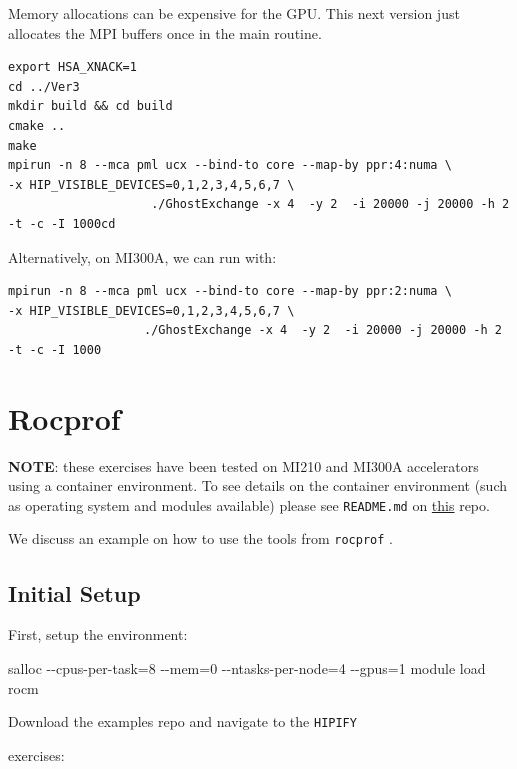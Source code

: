 \documentclass[
]{article}
\let\oldtexttt\texttt
\renewcommand{\texttt}[1]{
  \colorbox{Light}{\oldtexttt{#1}}
}
\newenvironment{Shaded}{}{}
\newcommand{\ExtensionTok}[1]{#1}
\newcommand{\NormalTok}[1]{#1}
\begin{document}
Memory allocations can be expensive for the GPU. This next version just
allocates the MPI buffers once in the main routine.

\begin{verbatim}
export HSA_XNACK=1
cd ../Ver3
mkdir build && cd build
cmake ..
make
mpirun -n 8 --mca pml ucx --bind-to core --map-by ppr:4:numa \
-x HIP_VISIBLE_DEVICES=0,1,2,3,4,5,6,7 \
                    ./GhostExchange -x 4  -y 2  -i 20000 -j 20000 -h 2 -t -c -I 1000cd
\end{verbatim}

Alternatively, on MI300A, we can run with:

\begin{verbatim}
mpirun -n 8 --mca pml ucx --bind-to core --map-by ppr:2:numa \
-x HIP_VISIBLE_DEVICES=0,1,2,3,4,5,6,7 \
                   ./GhostExchange -x 4  -y 2  -i 20000 -j 20000 -h 2 -t -c -I 1000
\end{verbatim}


\pagebreak

\hypertarget{rocprof}{%
\section{Rocprof}\label{rocprof}}

\textbf{NOTE}: these exercises have been tested on MI210 and MI300A
accelerators using a container environment. To see details on the
container environment (such as operating system and modules available)
please see \texttt{README.md} on
\href{https://github.com/amd/HPCTrainingDock}{this} repo.

We discuss an example on how to use the tools from \texttt{rocprof}.

\hypertarget{initial-setup}{%
\subsection{Initial Setup}\label{initial-setup}}

First, setup the environment:

\begin{Shaded}
\begin{Highlighting}[]
\ExtensionTok{salloc}\NormalTok{ {-}{-}cpus{-}per{-}task=8 {-}{-}mem=0 {-}{-}ntasks{-}per{-}node=4 {-}{-}gpus=1}
\ExtensionTok{module}\NormalTok{ load rocm}
\end{Highlighting}
\end{Shaded}

Download the examples repo and navigate to the \texttt{HIPIFY}
exercises:
\end{document}
